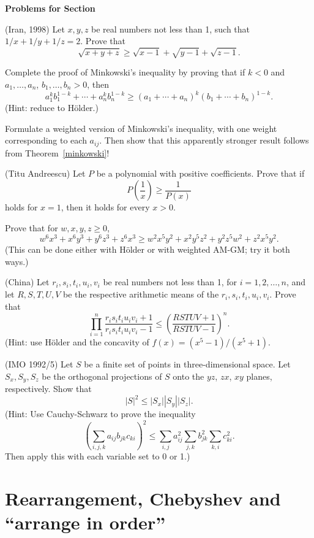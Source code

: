 \documentclass[12pt]{report}
\def\Lp{\left(}
\def\Rp{\right)}
\def\ii{\item}
\newcounter{exc}
\numberwithin{exc}{section}
\newenvironment{exer}{\vspace{0.1in}
\noindent \textbf{Problems for Section~\thesection} \vspace{0.1in}
\begin{list}{\arabic{exc}.}{\usecounter{exc}}}{\end{list}}
\begin{document}
\begin{exer}
\ii
(Iran, 1998)
Let $x,y,z$ be real numbers not less than 1, such that $1/x + 1/y + 
1/z = 2$. Prove that
\[
\sqrt{x+y+z} \geq \sqrt{x-1} + \sqrt{y-1} + \sqrt{z-1}.
\]
\ii \label{backholder}
Complete the proof of Minkowski's inequality by proving that if
$k < 0$ and $a_1, \dots, a_n$, $b_1, \dots, b_n > 0$, then
\[
a_1^k b_1^{1-k} + \cdots + a_n^k b_n^{1-k}
\geq
(a_1 + \cdots + a_n)^k (b_1 + \cdots + b_n)^{1-k}.
\]
(Hint: reduce to H\"older.)
\ii
Formulate a weighted version of Minkowski's inequality, with one weight
corresponding to each $a_{ij}$. Then show that this apparently stronger
result follows from Theorem~\ref{minkowski}!
\ii (Titu Andreescu)
Let $P$ be a polynomial with positive coefficients.  Prove that if 
\[P\Lp\frac 1x \Rp\geq \frac{1}{P(x)}\]
holds for $x=1$, then it holds for every $x>0$.
\ii
Prove that for $w,x,y,z \geq 0$,
\[
w^{6}x^{3} + x^{6} y^{3} + y^{6}z^{3} + z^{6}x^{3} \geq 
w^{2}x^{5}y^{2} + x^{2}y^{5}z^{2} + y^{2}z^{5}w^{2} + z^{2}x^{5}y^{2}.
\]
(This can be done either with H\"older or with weighted AM-GM; try it 
both ways.)
\ii (China)
Let $r_i, s_i, t_i, u_i, v_i$ be real numbers not less than 1,
for $i=1,2,\dots, n$, and let $R,S,T,U,V$ be the respective 
arithmetic means of the $r_i, s_i, t_i, u_i, v_i$. Prove that
\[
\prod_{i=1}^n \frac{r_is_it_iu_iv_i+1}{r_is_it_iu_iv_i-1}
\leq \left( \frac{RSTUV+1}{RSTUV-1} \right)^n.
\]
(Hint: use H\"older and the concavity of $f(x) = (x^5-1)/(x^5+1)$.
\ii (IMO 1992/5) Let $S$ be a finite set of points in three-dimensional
space. Let $S_x, S_y, S_z$ be the orthogonal projections of $S$ onto the
$yz$, $zx$, $xy$ planes, respectively. Show that 
\[
|S|^2 \leq |S_x| |S_y||S_z|.
\]
(Hint: Use Cauchy-Schwarz to prove the inequality
\[
\left( \sum_{i,j,k} a_{ij} b_{jk} c_{ki} \right)^2
\leq \sum_{i,j} a_{ij}^2 \sum_{j,k} b_{jk}^2 \sum_{k,i} c_{ki}^2.
\]
Then apply this with each variable set to 0 or 1.)
\end{exer}

\section{Rearrangement, Chebyshev and ``arrange in order''}
\end{document}
